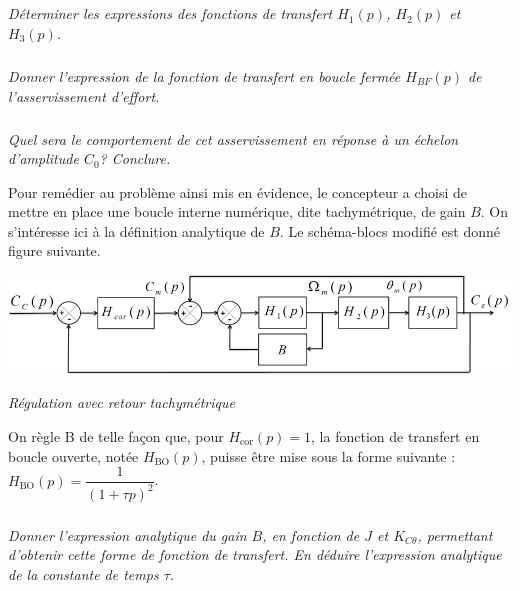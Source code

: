 \documentclass[10pt,fleqn]{article} %
\begin{document}
\begin{multicols}{2}
\subparagraph{}
\textit{Déterminer les expressions des fonctions de transfert $H_1(p)$, $H_2(p)$ et $H_3(p)$.}
\ifprof
\begin{corrige}
\end{corrige}
\else
\fi

\subparagraph{}
\textit{Donner l’expression de la fonction de transfert en boucle fermée $H_{BF}(p)$ de l’asservissement
d’effort.}

\ifprof
\begin{corrige}
\end{corrige}
\else
\fi

\subparagraph{}
\textit{Quel sera le comportement de cet asservissement en réponse à un échelon d'amplitude $C_0$?
Conclure.}
\ifprof
\begin{corrige}
\end{corrige}
\else
\fi

\vspace{.25cm}

Pour remédier au problème ainsi mis en évidence, le concepteur a choisi de mettre en place une boucle
interne numérique, dite tachymétrique, de gain $B$. On s’intéresse ici à la définition analytique de $B$.
Le schéma-blocs modifié est donné figure suivante.


\begin{center}
\includegraphics[width=\linewidth]{images/fig_07}

\textit{Régulation avec retour tachymétrique}
\end{center}


On règle B de telle façon que, pour $H_{\text{cor}}(p)=1$, la fonction de transfert en boucle ouverte, notée $H_{\text{BO}}(p)$, puisse être mise sous la forme suivante : 
$H_{\text{BO}}(p)=\dfrac{1}{\left(1+\tau p\right)^2}$.



\subparagraph{}
\textit{Donner l’expression analytique du gain $B$, en fonction de $J$ et $K_{C\theta}$, permettant d’obtenir cette
forme de fonction de transfert. En déduire l’expression analytique de la constante de temps $\tau$.}
\ifprof
\begin{corrige}
\end{corrige}
\else
\fi


\end{multicols}
\end{document}
